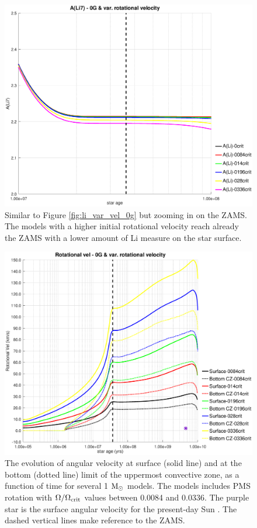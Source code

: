 \documentclass[fleqn,usenatbib]{mnras}
\begin{document}
\begin{figure}
	\includegraphics[trim = 35mm 15mm 20mm 15mm, clip,width=\columnwidth]{figures/li_var_vel_0_0g_z1.eps}
    \caption {Similar to Figure \ref{fig:li_var_vel_0g} but zooming in on the ZAMS. The models with a higher initial rotational velocity reach already the ZAMS with a lower amount of Li measure on the star surface.}
    \label{fig:li_var_vel_0g_z1}
\end{figure}

\begin{figure}
	\includegraphics[trim = 30mm 15mm 20mm 15mm, clip,width=\columnwidth]{figures/rot_vel_var_vel_0_0g.eps}
    \caption{The evolution of angular velocity at surface (solid line) and at the bottom (dotted line) limit of the uppermost convective zone, as a function of time for several 1 $\mathrm{M}_\odot$ models. The models includes PMS rotation with $\Omega / \Omega_{\mathrm{crit}}$ values between 0.0084 and 0.0336. The purple star is the surface angular velocity for the present-day Sun \citep{Gill2012}. The dashed vertical lines make reference to the ZAMS.}
    \label{fig:rot_vel_0g}
\end{figure}
\end{document}
